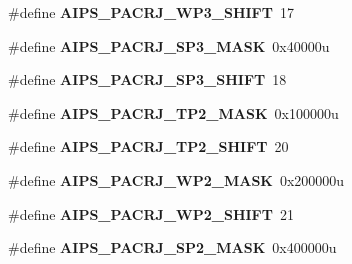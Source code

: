 \begin{DoxyCompactItemize}
\item 
\#define {\bfseries A\+I\+P\+S\+\_\+\+P\+A\+C\+R\+J\+\_\+\+W\+P3\+\_\+\+S\+H\+I\+FT}~17\hypertarget{group__AIPS__Register__Masks_gab5d01474f79b78fab907fe87f8112fab}{}\label{group__AIPS__Register__Masks_gab5d01474f79b78fab907fe87f8112fab}

\item 
\#define {\bfseries A\+I\+P\+S\+\_\+\+P\+A\+C\+R\+J\+\_\+\+S\+P3\+\_\+\+M\+A\+SK}~0x40000u\hypertarget{group__AIPS__Register__Masks_ga0936526072b7c1cdcafcdd49530d4b8b}{}\label{group__AIPS__Register__Masks_ga0936526072b7c1cdcafcdd49530d4b8b}

\item 
\#define {\bfseries A\+I\+P\+S\+\_\+\+P\+A\+C\+R\+J\+\_\+\+S\+P3\+\_\+\+S\+H\+I\+FT}~18\hypertarget{group__AIPS__Register__Masks_ga5482c8ad612901797144336d84cfe79d}{}\label{group__AIPS__Register__Masks_ga5482c8ad612901797144336d84cfe79d}

\item 
\#define {\bfseries A\+I\+P\+S\+\_\+\+P\+A\+C\+R\+J\+\_\+\+T\+P2\+\_\+\+M\+A\+SK}~0x100000u\hypertarget{group__AIPS__Register__Masks_gac450543f7cf9c70fa510fe14a4d9281f}{}\label{group__AIPS__Register__Masks_gac450543f7cf9c70fa510fe14a4d9281f}

\item 
\#define {\bfseries A\+I\+P\+S\+\_\+\+P\+A\+C\+R\+J\+\_\+\+T\+P2\+\_\+\+S\+H\+I\+FT}~20\hypertarget{group__AIPS__Register__Masks_gaa333e64f1f89dd2a04eda478410f1e2f}{}\label{group__AIPS__Register__Masks_gaa333e64f1f89dd2a04eda478410f1e2f}

\item 
\#define {\bfseries A\+I\+P\+S\+\_\+\+P\+A\+C\+R\+J\+\_\+\+W\+P2\+\_\+\+M\+A\+SK}~0x200000u\hypertarget{group__AIPS__Register__Masks_gaf8d56e51bb37bf9a355e9df5cb4f45b8}{}\label{group__AIPS__Register__Masks_gaf8d56e51bb37bf9a355e9df5cb4f45b8}

\item 
\#define {\bfseries A\+I\+P\+S\+\_\+\+P\+A\+C\+R\+J\+\_\+\+W\+P2\+\_\+\+S\+H\+I\+FT}~21\hypertarget{group__AIPS__Register__Masks_ga292cf7ba35be9b4bba8f37fffe22b9ab}{}\label{group__AIPS__Register__Masks_ga292cf7ba35be9b4bba8f37fffe22b9ab}

\item 
\#define {\bfseries A\+I\+P\+S\+\_\+\+P\+A\+C\+R\+J\+\_\+\+S\+P2\+\_\+\+M\+A\+SK}~0x400000u\hypertarget{group__AIPS__Register__Masks_ga7fc32443b5c444d0906620ee9f416e63}{}\label{group__AIPS__Register__Masks_ga7fc32443b5c444d0906620ee9f416e63}


\end{DoxyCompactItemize}
